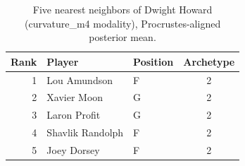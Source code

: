 \begin{table}[htbp]
  \centering\small
  \begin{tabular}{rllc}
    \toprule
    Rank & Player & Position & Archetype \\
    \midrule
    1 & Lou Amundson & F & 2 \\
    2 & Xavier Moon & G & 2 \\
    3 & Laron Profit & G & 2 \\
    4 & Shavlik Randolph & F & 2 \\
    5 & Joey Dorsey & F & 2 \\
    \bottomrule
  \end{tabular}
  \caption{Five nearest neighbors of Dwight Howard (curvature_m4 modality), Procrustes-aligned posterior mean.}
  \label{tab:Dwight_Howard_neighbors_curvature_m4}
\end{table}

